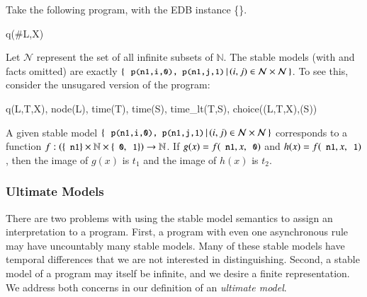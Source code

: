 \begin{example}
\label{ex:uncountable}
Take the following \lang program, with the EDB instance \{\}.

\begin{Drules}
        {q(#L,X)}
\end{Drules}

Let $\mathcal{N}$ represent the set of all infinite subsets of $\mathbb{N}$.
The stable models (with  and  facts omitted) are exactly \linebreak $\{ \, \dedalus{p(n1,i,0), p(n1,j,1)} \, | \, (i,j) \in \mathcal{N}
\times \mathcal{N} \, \}$.  To see this, consider the unsugared version of the program:

\begin{Drules}
        {q(L,T,X), node(L), time(T), time(S), time_lt(T,S), choice((L,T,X),(S))}
\end{Drules}

A given stable model $\{ \, \dedalus{p(n1,i,0), p(n1,j,1)} \, | \, (i,j)\in \mathcal{N}                                                    
\times \mathcal{N} \, \}$ corresponds to a function $f : \left(\{\dedalus{n1}\} \times \mathbb{N} \times \{\dedalus{0},\dedalus{1}\}\right) \rightarrow \mathbb{N}$.  If $g(x) = f(\dedalus{n1}, x, \dedalus{0})$ and $h(x) = f(\dedalus{n1}, x, \dedalus{1})$, then the image of $g(x)$ is $t_1$ and the image of $h(x)$ is $t_2$.
\end{example}


\subsubsection{Ultimate Models}
There are two problems with using the stable model semantics to assign an
interpretation to a \lang program. First, a program with even one asynchronous
rule may have uncountably many stable models.  Many of these stable models have
temporal differences that we are not interested in distinguishing.  Second, a
stable model of a \lang program may itself be infinite, and we desire a finite
representation.  We address both concerns in our definition of an {\em ultimate
  model}.

